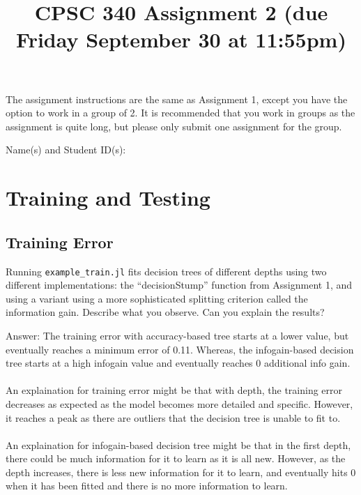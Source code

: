 \documentclass{article}
\def\ans#1{\par\gre{Answer: #1}}
\def\blu#1{{\color{blu}#1}}
\def\gre#1{{\color{gre}#1}}
\begin{document}
\title{CPSC 340 Assignment 2 (due Friday September 30 at 11:55pm)}
\author{}
\date{}
\maketitle
\vspace{-4em}


The assignment instructions are the same as Assignment 1, except you have the option to work in a group of 2.
It is recommended that you work in groups as the assignment is quite long, but please only submit one assignment for the group.

\blu{Name(s) and Student ID(s):}

\section{Training and Testing}

\subsection{Training Error}

Running \texttt{example\_train.jl} fits decision trees of different depths using two different implementations:
the ``decisionStump'' function from Assignment 1, and using a variant using a more sophisticated splitting criterion called the information gain. \blu{Describe what you observe. Can you explain the results?}

\ans{
The training error with accuracy-based tree starts at a lower value, but eventually reaches a minimum error of 0.11. Whereas, the infogain-based decision tree starts at a high infogain value and eventually reaches 0 additional info gain.\\
\\
An explaination for training error might be that with depth, the training error decreases as expected as the model becomes more detailed and specific. However, it reaches a peak as there are outliers that the decision tree is unable to fit to.\\
\\
An explaination for infogain-based decision tree might be that in the first depth, there could be much information for it to learn as it is all new. However, as the depth increases, there is less new information for it to learn, and eventually hits 0 when it has been fitted and there is no more information to learn.}
\end{document}
